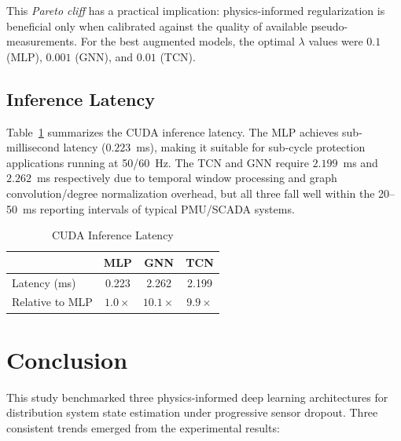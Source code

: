 \documentclass[conference]{IEEEtran}
\begin{document}
This \textit{Pareto cliff} has a practical implication: physics-informed regularization is beneficial only when calibrated against the quality of available pseudo-measurements. For the best augmented models, the optimal $\lambda$ values were $0.1$ (MLP), $0.001$ (GNN), and $0.01$ (TCN).

\subsection{Inference Latency}

Table~\ref{tab:latency} summarizes the CUDA inference latency. The MLP achieves sub-millisecond latency ($0.223$~ms), making it suitable for sub-cycle protection applications running at 50/60~Hz. The TCN and GNN require $2.199$~ms and $2.262$~ms respectively due to temporal window processing and graph convolution/degree normalization overhead, but all three fall well within the 20--50~ms reporting intervals of typical PMU/SCADA systems.

\begin{table}[t]
\centering
\caption{CUDA Inference Latency}
\label{tab:latency}
\footnotesize
\begin{tabular}{lccc}
\toprule
 & \textbf{MLP} & \textbf{GNN} & \textbf{TCN} \\
\midrule
Latency (ms) & 0.223 & 2.262 & 2.199 \\
Relative to MLP & $1.0\times$ & $10.1\times$ & $9.9\times$ \\
\bottomrule
\end{tabular}
\end{table}

\section{Conclusion}

This study benchmarked three physics-informed deep learning architectures for distribution system state estimation under progressive sensor dropout. Three consistent trends emerged from the experimental results:
\end{document}
